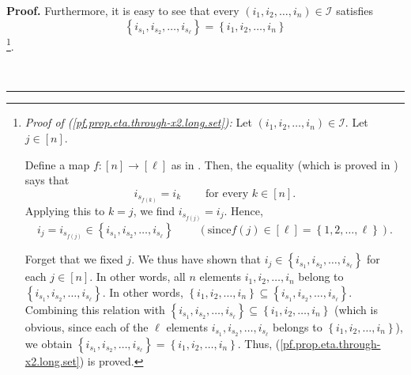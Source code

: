 \documentclass[numbers=enddot,12pt,final,onecolumn,notitlepage]{scrartcl}%
\theoremstyle{definition}
\newenvironment{proof}[1][Proof]{\noindent\textbf{#1.} }{\ \rule{0.5em}{0.5em}}
\newenvironment{verlong}{}{}
\begin{document}
\begin{verlong}
\begin{proof}
Furthermore, it is easy to see that every $\left(  i_{1},i_{2},\ldots
,i_{n}\right)  \in\mathcal{I}$ satisfies%
\begin{equation}
\left\{  i_{s_{1}},i_{s_{2}},\ldots,i_{s_{\ell}}\right\}  =\left\{
i_{1},i_{2},\ldots,i_{n}\right\}  \label{pf.prop.eta.through-x2.long.set}%
\end{equation}
\footnote{\textit{Proof of (\ref{pf.prop.eta.through-x2.long.set}):} Let
$\left(  i_{1},i_{2},\ldots,i_{n}\right)  \in\mathcal{I}$. Let $j\in\left[
n\right]  $.
\par
Define a map $f:\left[  n\right]  \rightarrow\left[  \ell\right]  $ as in
\cite[detailed version, Lemma 10.7]{Grinbe15}. Then, the equality
\cite[detailed version, (101)]{Grinbe15} (which is proved in \cite{Grinbe15})
says that%
\[
i_{s_{f\left(  k\right)  }}=i_{k}\ \ \ \ \ \ \ \ \ \ \text{for every }%
k\in\left[  n\right]  .
\]
Applying this to $k=j$, we find $i_{s_{f\left(  j\right)  }}=i_{j}$. Hence,%
\[
i_{j}=i_{s_{f\left(  j\right)  }}\in\left\{  i_{s_{1}},i_{s_{2}}%
,\ldots,i_{s_{\ell}}\right\}  \ \ \ \ \ \ \ \ \ \ \left(  \text{since
}f\left(  j\right)  \in\left[  \ell\right]  =\left\{  1,2,\ldots,\ell\right\}
\right)  .
\]
\par
Forget that we fixed $j$. We thus have shown that $i_{j}\in\left\{  i_{s_{1}%
},i_{s_{2}},\ldots,i_{s_{\ell}}\right\}  $ for each $j\in\left[  n\right]  $.
In other words, all $n$ elements $i_{1},i_{2},\ldots,i_{n}$ belong to
$\left\{  i_{s_{1}},i_{s_{2}},\ldots,i_{s_{\ell}}\right\}  $. In other words,
$\left\{  i_{1},i_{2},\ldots,i_{n}\right\}  \subseteq\left\{  i_{s_{1}%
},i_{s_{2}},\ldots,i_{s_{\ell}}\right\}  $. Combining this relation with
$\left\{  i_{s_{1}},i_{s_{2}},\ldots,i_{s_{\ell}}\right\}  \subseteq\left\{
i_{1},i_{2},\ldots,i_{n}\right\}  $ (which is obvious, since each of the
$\ell$ elements $i_{s_{1}},i_{s_{2}},\ldots,i_{s_{\ell}}$ belongs to $\left\{
i_{1},i_{2},\ldots,i_{n}\right\}  $), we obtain $\left\{  i_{s_{1}},i_{s_{2}%
},\ldots,i_{s_{\ell}}\right\}  =\left\{  i_{1},i_{2},\ldots,i_{n}\right\}  $.
Thus, (\ref{pf.prop.eta.through-x2.long.set}) is proved.}.


\end{proof}
\end{verlong}
\end{document}
